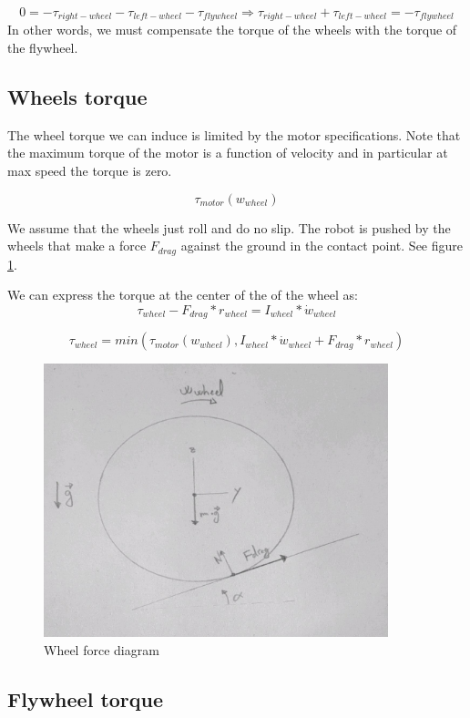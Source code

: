 \begin{equation} \label{eq:control equation}
0 = -\tau_{right-wheel} -\tau_{left-wheel} -\tau_{flywheel} \Rightarrow \tau_{right-wheel} +\tau_{left-wheel} = -\tau_{flywheel}
\end{equation}
In other words, we must compensate the torque of the wheels with the torque of the flywheel.

\subsection{Wheels torque}
The wheel torque we can induce is limited by the motor specifications. Note that the maximum torque of the motor is a function of velocity and in particular at max speed the torque is zero.

\[\tau_{motor} (w_{wheel}) \]


We assume that the wheels just roll and do no slip.
The robot is pushed by the wheels that make a force $F_{drag}$ against the ground in the contact point. See figure \ref{fig:Wheel force diagram}.

We can express the torque at the center of the of the wheel as:
\[\tau_{wheel} - F_{drag} * r_{wheel} = I_{wheel} * \dot{w}_{wheel} \]

\begin{equation} \label{wheel torque equation}
\tau_{wheel} = min(\tau_{motor} (w_{wheel}),I_{wheel} * \dot{w}_{wheel} + F_{drag} * r_{wheel})
\end{equation}
\begin{figure}[ht]
	\centering
	\includegraphics[width=10cm]{img/wheel_diagram.jpg}
	\caption{Wheel force diagram}
	\label{fig:Wheel force diagram}
\end{figure}


\subsection{Flywheel torque}


